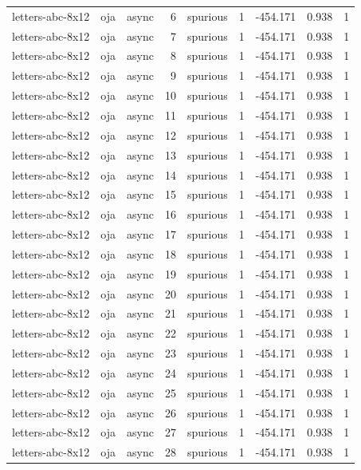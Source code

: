 \begin{tabular}{lllrlrrrr}
letters-abc-8x12 & oja & async & 6 & spurious & 1 & -454.171 & 0.938 & 1 \\
letters-abc-8x12 & oja & async & 7 & spurious & 1 & -454.171 & 0.938 & 1 \\
letters-abc-8x12 & oja & async & 8 & spurious & 1 & -454.171 & 0.938 & 1 \\
letters-abc-8x12 & oja & async & 9 & spurious & 1 & -454.171 & 0.938 & 1 \\
letters-abc-8x12 & oja & async & 10 & spurious & 1 & -454.171 & 0.938 & 1 \\
letters-abc-8x12 & oja & async & 11 & spurious & 1 & -454.171 & 0.938 & 1 \\
letters-abc-8x12 & oja & async & 12 & spurious & 1 & -454.171 & 0.938 & 1 \\
letters-abc-8x12 & oja & async & 13 & spurious & 1 & -454.171 & 0.938 & 1 \\
letters-abc-8x12 & oja & async & 14 & spurious & 1 & -454.171 & 0.938 & 1 \\
letters-abc-8x12 & oja & async & 15 & spurious & 1 & -454.171 & 0.938 & 1 \\
letters-abc-8x12 & oja & async & 16 & spurious & 1 & -454.171 & 0.938 & 1 \\
letters-abc-8x12 & oja & async & 17 & spurious & 1 & -454.171 & 0.938 & 1 \\
letters-abc-8x12 & oja & async & 18 & spurious & 1 & -454.171 & 0.938 & 1 \\
letters-abc-8x12 & oja & async & 19 & spurious & 1 & -454.171 & 0.938 & 1 \\
letters-abc-8x12 & oja & async & 20 & spurious & 1 & -454.171 & 0.938 & 1 \\
letters-abc-8x12 & oja & async & 21 & spurious & 1 & -454.171 & 0.938 & 1 \\
letters-abc-8x12 & oja & async & 22 & spurious & 1 & -454.171 & 0.938 & 1 \\
letters-abc-8x12 & oja & async & 23 & spurious & 1 & -454.171 & 0.938 & 1 \\
letters-abc-8x12 & oja & async & 24 & spurious & 1 & -454.171 & 0.938 & 1 \\
letters-abc-8x12 & oja & async & 25 & spurious & 1 & -454.171 & 0.938 & 1 \\
letters-abc-8x12 & oja & async & 26 & spurious & 1 & -454.171 & 0.938 & 1 \\
letters-abc-8x12 & oja & async & 27 & spurious & 1 & -454.171 & 0.938 & 1 \\
letters-abc-8x12 & oja & async & 28 & spurious & 1 & -454.171 & 0.938 & 1 \\

\end{tabular}
